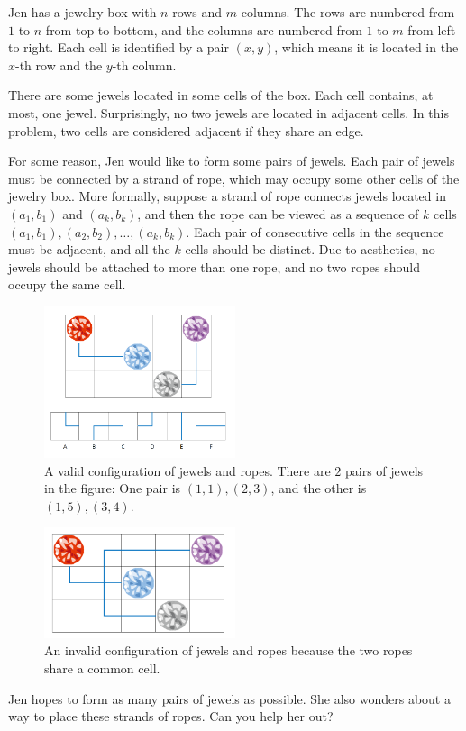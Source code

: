 Jen has a jewelry box with $n$ rows and $m$ columns.
The rows are numbered from $1$ to $n$ from top to bottom, and the columns are numbered from $1$ to $m$ from left to right.
Each cell is identified by a pair $(x, y)$, which means it is located in the $x$-th row and the $y$-th column.

There are some jewels located in some cells of the box.
Each cell contains, at most, one jewel.
Surprisingly, no two jewels are located in adjacent cells.
In this problem, two cells are considered adjacent if they share an edge.

For some reason, Jen would like to form some pairs of jewels.
Each pair of jewels must be connected by a strand of rope, which may occupy some other cells of the jewelry box.
More formally, suppose a strand of rope connects jewels located in $(a_1,b_1)$ and $(a_k,b_k)$, and then the rope can be viewed as a sequence of $k$ cells $(a_1,b_1),(a_2,b_2),\ldots,(a_k,b_k)$.
Each pair of consecutive cells in the sequence must be adjacent, and all the $k$ cells should be distinct.
Due to aesthetics, no jewels should be attached to more than one rope, and no two ropes should occupy the same cell.

\newpage

\begin{figure}[h]
    \center
    \includegraphics[width=0.5\textwidth]{image/jewel1.png}
    \caption{A valid configuration of jewels and ropes. There are $2$ pairs of jewels in the figure: One pair is $(1,1),(2,3)$, and the other is $(1,5),(3,4)$.}
    \end{figure}
    \begin{figure}[h]
    \center
    \includegraphics[width=0.5\textwidth]{image/jewel2.png}
    \caption{An invalid configuration of jewels and ropes because the two ropes share a common cell.}
    \end{figure}
Jen hopes to form as many pairs of jewels as possible. She also wonders about a way to place these strands of ropes. Can you help her out?